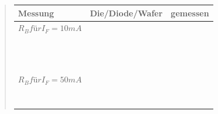\begin{quote}
      \begin{table}[h]
    	        \begin{addmargin}[-1cm]{3cm}
    	          \centering
                     \begin{tabular}{|p{3cm}|p{3cm}|p{10.2cm}|}
         \hline
         Messung                 & Die/Diode/Wafer & gemessen\\ 
         \hline
         $R_{B} für I_{F}=10 mA$ &           &                  \\
                                 &           &                  \\ 
                                 &           &                  \\
                                 &           &                  \\ 
                                 &           &                  \\
                                 &           &                  \\ 
                                 &           &                  \\
                                 &           &                  \\ 
                                 &           &                  \\
                                 &           &                  \\ 
                                 &           &                  \\
                                 &           &                  \\ 
                                 &           &                  \\
         \hline
         $R_{B} für I_{F}=50 mA$ &           &                  \\
                                 &           &                  \\ 
                                 &           &                  \\
                                 &           &                  \\ 
                                 &           &                  \\
                                 &           &                  \\ 
                                 &           &                  \\
                                 &           &                  \\ 

\end{tabular}
\end{addmargin}
\end{table}
\end{quote}
